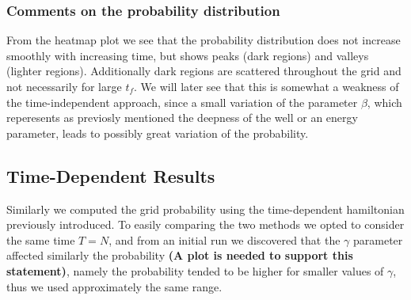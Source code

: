         \subsubsection*{Comments on the probability distribution}
        From the heatmap plot we see that the probability distribution does not increase smoothly with increasing time, but shows peaks (dark regions) and valleys (lighter regions). Additionally dark regions are scattered throughout the grid and not necessarily for large $t_f$. We will later see that this is somewhat a weakness of the time-independent approach, since a small variation of the parameter $\beta$, which reperesents as previosly mentioned the deepness of the well or an energy parameter, leads to possibly great variation of the probability.

    \subsection{Time-Dependent Results}
        Similarly we computed the grid probability using the time-dependent hamiltonian previously introduced. To easily comparing the two methods we opted to consider the same time $T=N$, and from an initial run we discovered that the $\gamma$ parameter affected similarly the probability \textbf{(A plot is needed to support this statement)}, namely the probability tended to be higher for smaller values of $\gamma$, thus we used approximately the same range. \\

